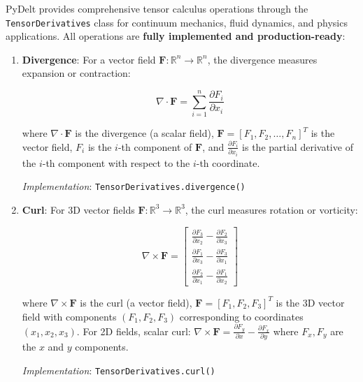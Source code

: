 \documentclass[10pt,journal,compsoc]{IEEEtran}
\begin{document}
PyDelt provides comprehensive tensor calculus operations through the \texttt{TensorDerivatives} class for continuum mechanics, fluid dynamics, and physics applications. All operations are \textbf{fully implemented and production-ready}:

\begin{enumerate}
    \item \textbf{Divergence}: For a vector field $\mathbf{F}: \mathbb{R}^n \rightarrow \mathbb{R}^n$, the divergence measures expansion or contraction:
    
    \begin{equation}
        \nabla \cdot \mathbf{F} = \sum_{i=1}^{n} \frac{\partial F_i}{\partial x_i}
    \end{equation}
    
    where $\nabla \cdot \mathbf{F}$ is the divergence (a scalar field), $\mathbf{F} = [F_1, F_2, \ldots, F_n]^T$ is the vector field, $F_i$ is the $i$-th component of $\mathbf{F}$, and $\frac{\partial F_i}{\partial x_i}$ is the partial derivative of the $i$-th component with respect to the $i$-th coordinate.
    
    \textit{Implementation}: \texttt{TensorDerivatives.divergence()}
    
    \item \textbf{Curl}: For 3D vector fields $\mathbf{F}: \mathbb{R}^3 \rightarrow \mathbb{R}^3$, the curl measures rotation or vorticity:
    
    \begin{equation}
        \nabla \times \mathbf{F} = \begin{bmatrix}
        \frac{\partial F_3}{\partial x_2} - \frac{\partial F_2}{\partial x_3} \\
        \frac{\partial F_1}{\partial x_3} - \frac{\partial F_3}{\partial x_1} \\
        \frac{\partial F_2}{\partial x_1} - \frac{\partial F_1}{\partial x_2}
        \end{bmatrix}
    \end{equation}
    
    where $\nabla \times \mathbf{F}$ is the curl (a vector field), $\mathbf{F} = [F_1, F_2, F_3]^T$ is the 3D vector field with components $(F_1, F_2, F_3)$ corresponding to coordinates $(x_1, x_2, x_3)$. For 2D fields, scalar curl: $\nabla \times \mathbf{F} = \frac{\partial F_y}{\partial x} - \frac{\partial F_x}{\partial y}$ where $F_x, F_y$ are the $x$ and $y$ components.
    
    
    \textit{Implementation}: \texttt{TensorDerivatives.curl()}
    

\end{enumerate}
\end{document}
